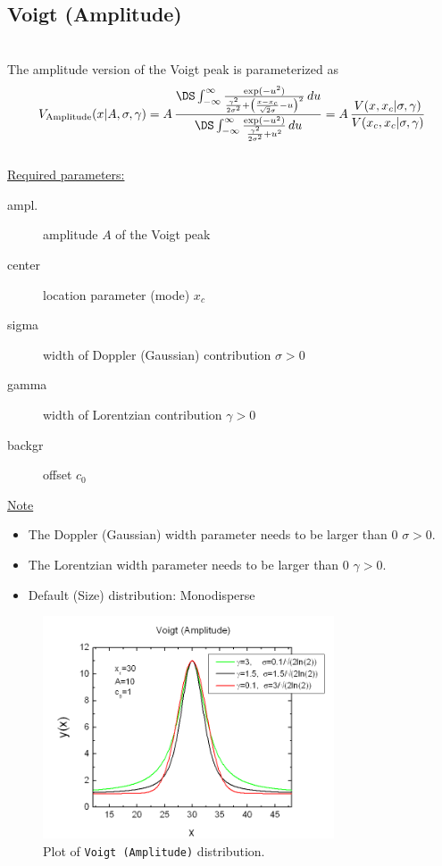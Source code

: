 \clearpage
\subsection{Voigt (Amplitude)} ~\\[5mm]
\label{sec:VoigtAmplitude}
The amplitude version of the Voigt peak is parameterized as
\begin{equation}
V_\text{Amplitude}(x\vert A,\sigma,\gamma)
= A \, \frac{\DS \int_{-\infty}^\infty \frac{\exp(-u^2)}{\frac{\gamma^2}{2\sigma^2}+\left( \frac{x-x_c}{\sqrt{2}\sigma}-u\right)^2} \, du}{\DS \int_{-\infty}^\infty \frac{\exp(-u^2)}{\frac{\gamma^2}{2\sigma^2}+u^2}\, du}
= A \, \frac{V(x,x_c\vert\sigma,\gamma)}{V(x_c,x_c\vert\sigma,\gamma)}
\end{equation}
~\\

\uline{Required parameters:}
\begin{description}
    \item[ampl.] amplitude $A$ of the Voigt peak
    \item[center] location parameter (mode) $x_c$
    \item[sigma] width of Doppler (Gaussian) contribution $\sigma>0$
    \item[gamma] width of Lorentzian contribution $\gamma>0$
    \item[backgr] offset $c_0$
\end{description}

\uline{Note}
\begin{itemize}
  \item The Doppler (Gaussian) width parameter needs to be larger than 0 $\sigma>0$.
  \item The Lorentzian width parameter needs to be larger than 0 $\gamma>0$.
  \item Default (Size) distribution: Monodisperse
\end{itemize}


\begin{figure}[htb]
\begin{center}
\includegraphics[width=0.768\textwidth]{VoigtAmplitude.png}
\end{center}
\caption{Plot of \texttt{Voigt (Amplitude)} distribution.}
\label{fig:VoigtAmplitude}
\end{figure}


